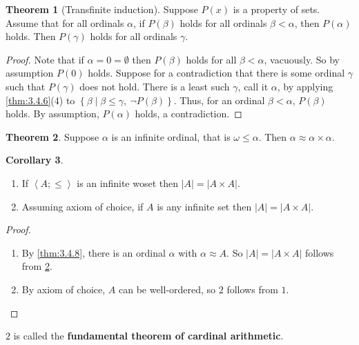 \documentclass{article}
\newcommand{\rb}[1]{\left( #1 \right)}
\newcommand{\cb}[1]{\left\{ #1 \right\}}
\newcommand{\ab}[1]{\left\langle #1 \right\rangle}
\newcommand{\abs}[1]{\left\lvert #1 \right\rvert}
\theoremstyle{definition}\newtheorem{definition}{Definition}[subsection]
\theoremstyle{definition}\newtheorem{remark}[definition]{Remark}
\theoremstyle{definition}\newtheorem*{example}{Example}
\theoremstyle{definition}\newtheorem*{note}{Note}
\newtheorem{theorem}[definition]{Theorem}
\newtheorem{corollary}[definition]{Corollary}
\begin{document}
\begin{theorem}[Transfinite induction]
Suppose $ P\rb{x} $ is a property of sets. Assume that for all ordinals $ \alpha $, if $ P\rb{\beta} $ holds for all ordinals $ \beta < \alpha $, then $ P\rb{\alpha} $ holds. Then $ P\rb{\gamma} $ holds for all ordinals $ \gamma $.
\end{theorem}

\begin{proof}
Note that if $ \alpha = 0 = \emptyset $ then $ P\rb{\beta} $ holds for all $ \beta < \alpha $, vacuously. So by assumption $ P\rb{0} $ holds. Suppose for a contradiction that there is some ordinal $ \gamma $ such that $ P\rb{\gamma} $ does not hold. There is a least such $ \gamma $, call it $ \alpha $, by applying \ref{thm:3.4.6}(4) to $ \cb{\beta \mid \beta \le \gamma, \ \neg P\rb{\beta}} $. Thus, for an ordinal $ \beta < \alpha $, $ P\rb{\beta} $ holds. By assumption, $ P\rb{\alpha} $ holds, a contradiction.
\end{proof}

\begin{theorem}
\label{thm:3.5.2}
Suppose $ \alpha $ is an infinite ordinal, that is $ \omega \le \alpha $. Then $ \alpha \approx \alpha \times \alpha $.
\end{theorem}

\begin{corollary}
\hfill
\begin{enumerate}
\item If $ \ab{A; \le} $ is an infinite woset then $ \abs{A} = \abs{A \times A} $.
\item Assuming axiom of choice, if $ A $ is any infinite set then $ \abs{A} = \abs{A \times A} $.
\end{enumerate}
\end{corollary}

\begin{proof}
\hfill
\begin{enumerate}
\item By \ref{thm:3.4.8}, there is an ordinal $ \alpha $ with $ \alpha \approx A $. So $ \abs{A} = \abs{A \times A} $ follows from \ref{thm:3.5.2}.
\item By axiom of choice, $ A $ can be well-ordered, so $ 2 $ follows from $ 1 $.
\end{enumerate}
\end{proof}

$ 2 $ is called the \textbf{fundamental theorem of cardinal arithmetic}.
\end{document}
